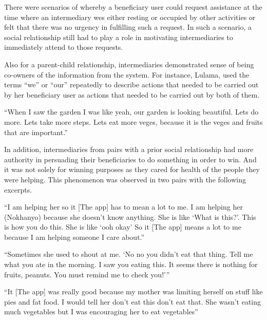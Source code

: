 There were scenarios of whereby a beneficiary user could request assistance at the time where an intermediary wes either resting or occupied by other activities or felt that there was no urgency in fulfilling  such a request. In such a scenario, a social relationship still had to play a role in motivating intermediaries to immediately attend to those requests.

Also for a parent-child relationship,  intermediaries demonstrated sense of being co-owners of the information from the system. For instance, Lulama, used the terms ``we'' or ``our'' repeatedly to describe actions that needed to be carried out by her beneficiary user as actions that needed to be carried out by both of them.
  
 {``When I saw the garden I was like yeah, our garden is looking beautiful. Lets do more. Lets take more steps. Lets eat more veges, because it is the veges and fruits that are important.''}

In addition, intermediaries from pairs with a prior social relationship had more authority in persuading their beneficiaries to do something in order to win. And it was not solely for winning purposes as they cared for health of the people they were helping. This phenomenon was observed in two pairs with the following excerpts.

 {``I am helping her so it [The app] has to mean a lot to me. I am helping her (Nokhanyo) because she doesn't know anything. She is like `What is this?'. This is how you do this. She is like `ooh okay' So it [The app] means a lot to me because I am helping someone I care about.''}

 {``Sometimes she used to shout at me. `No no you didn't eat that thing. Tell me what you ate in the morning. I saw you eating this. It seems there is nothing for fruits, peanuts. You must remind me to check you!'''}

{``It [The app] was really good because my 
mother was limiting herself on stuff like pies and fat food. I would tell 
her don't eat this don't eat that. She wasn't eating much vegetables but I 
was encouraging her to eat vegetables''}

